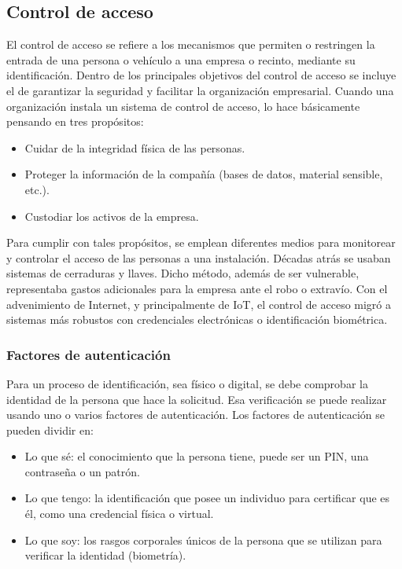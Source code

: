 \subsection{Control de acceso}

El control de acceso se refiere a los mecanismos que permiten o restringen la entrada de una persona o vehículo a una empresa o recinto, mediante su identificación. Dentro de los principales objetivos del control de acceso se incluye el de garantizar la seguridad y facilitar la organización empresarial. Cuando una organización instala un sistema de control de acceso, lo hace básicamente pensando en tres propósitos:

\begin{itemize}
\item Cuidar de la integridad física de las personas.
\item Proteger la información de la compañía (bases de datos, material sensible, etc.).
\item Custodiar los activos de la empresa.
\end{itemize}

Para cumplir con tales propósitos, se emplean diferentes medios para monitorear y controlar el acceso de las personas a una instalación. Décadas atrás se usaban sistemas de cerraduras y llaves. Dicho método, además de ser vulnerable, representaba gastos adicionales para la empresa ante el robo o extravío. Con el advenimiento de Internet, y principalmente de IoT, el control de acceso migró a sistemas más robustos con credenciales electrónicas o identificación biométrica.

\subsubsection{Factores de autenticación}
Para un proceso de identificación, sea físico o digital, se debe comprobar la identidad de la persona que hace la solicitud. Esa verificación se puede realizar usando uno o varios factores de autenticación. Los factores de autenticación se pueden dividir en:

\begin{itemize}
\item Lo que sé: el conocimiento que la persona tiene, puede ser un PIN, una contraseña o un patrón.
\item Lo que tengo: la identificación que posee un individuo para certificar que es él, como una credencial física o virtual.
\item Lo que soy: los rasgos corporales únicos de la persona que se utilizan para verificar la identidad (biometría).
\end{itemize}

